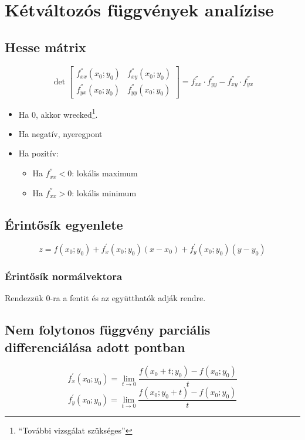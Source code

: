 \documentclass[a4paper,12pt]{article}
\begin{document}
\section{Kétváltozós függvények analízise}
\subsection{Hesse mátrix}
\begin{equation}
  \det
\begin{bmatrix}
  f^{''}_{xx}(x_0;y_0) & f^{''}_{xy}(x_0;y_0) \\
  f^{''}_{yx}(x_0;y_0) & f^{''}_{yy}(x_0;y_0)
\end{bmatrix}
= f^{''}_{xx} \cdot f^{''}_{yy} - f^{''}_{xy} \cdot  f^{''}_{yx}
\end{equation}
\begin{itemize}
\item Ha 0, akkor wrecked\footnote{``További vizsgálat szükséges''}.
\item Ha negatív, nyeregpont
\item Ha pozitív:
  \begin{itemize}
  \item Ha $f^{''}_{xx} < 0$: lokális maximum
  \item Ha $f^{''}_{xx} > 0$: lokális minimum
  \end{itemize}
\end{itemize}
\subsection{Érintősík egyenlete}
\begin{equation}
z = f(x_0;y_0) + f^{'}_x(x_0;y_0)(x-x_0) + f^{'}_y(x_0;y_0)(y-y_0)
\end{equation}
\subsubsection{Érintősík normálvektora}
Rendezzük 0-ra a fentit és az együtthatók adják rendre.

\subsection{Nem folytonos függvény parciális differenciálása adott pontban}

\begin{equation}
  f^{'}_x(x_0;y_0) = \lim_{t \rightarrow 0} \frac{f(x_0+t;y_0) - f(x_0;y_0)}{t}
\end{equation}
\begin{equation}
  f^{'}_y(x_0;y_0) = \lim_{t \rightarrow 0} \frac{f(x_0;y_0+t) - f(x_0;y_0)}{t}
\end{equation}
\end{document}

